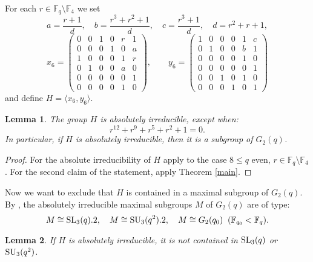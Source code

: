 \documentclass{amsart}
\newtheorem{lemma}{Lemma}[section]
\theoremstyle{remark}
\begin{document}
For each  $r\in {\mathbb{F}}_q\setminus {\mathbb{F}}_4$ we 
set 
\begin{equation}\label{abc}
a=\frac{r + 1}{d},\quad
b=\frac{r^3 + r^2+ 1}{d},\quad c=\frac{r^3 + 1}{d},\quad d=r^2+r+1,
\end{equation}
\begin{equation}\label{x,y}
 x_6= \begin{pmatrix}
  0 & 0 & 1 & 0 & r & 1 \\
  0 & 0 & 0 & 1 & 0 & a \\
  1 & 0 & 0 & 0 & 1 & r \\
  0 & 1 & 0 & 0 & a & 0 \\
  0 & 0 & 0 & 0 & 0 & 1   \\
  0 & 0 & 0 & 0 & 1 & 0
    \end{pmatrix},
 \qquad
   y_6=\begin{pmatrix}
  1 & 0 & 0 & 0 & 1 & c \\
  0 & 1 & 0 & 0 & b & 1 \\
  0 & 0 & 0 & 0 & 1 & 0 \\
  0 & 0 & 0 & 0 & 0 & 1 \\
  0 & 0 & 1 & 0 & 1 & 0 \\
  0 & 0 & 0 & 1 & 0 & 1
   \end{pmatrix}
\end{equation}
and  define $H=\langle x_6,y_6\rangle$.

\begin{lemma}\label{lemma: irreducibility} 
The group $H$ is absolutely irreducible, except when:
$$r^{12} + r^9 + r^5 +  r^2 +1=0.$$
In particular, if $H$ is absolutely irreducible, then it is a subgroup of $G_2(q)$.
\end{lemma}

\begin{proof}
For the absolute irreducibility of $H$ apply \cite[Lemma 2.1]{TV} to the case  
$8 \le q$ even, $r\in {\mathbb{F}}_q\setminus {\mathbb{F}}_4$. For the second claim of the statement, apply Theorem \ref{main}. 
\end{proof}

Now we want to exclude that $H$ is contained in a maximal subgroup of $G_2(q)$. 
By \cite{C}, the absolutely irreducible maximal subgroups $M$ of $G_2(q)$ are of type:
$$M\cong {\mathop{\rm SL}\nolimits}_3(q).2,\quad M\cong {\mathop{\rm SU}\nolimits}_3(q^ 2).2,\quad M\cong G_2(q_0)\;\;({\mathbb{F}}_{q_0}<{\mathbb{F}}_q).$$

\begin{lemma}\label{PSU(3,q)} 
If $H$ is absolutely irreducible, it is not contained in ${\mathop{\rm SL}\nolimits}_3(q)$ or ${\mathop{\rm SU}\nolimits}_3(q^ 2)$.
\end{lemma}
\end{document}
